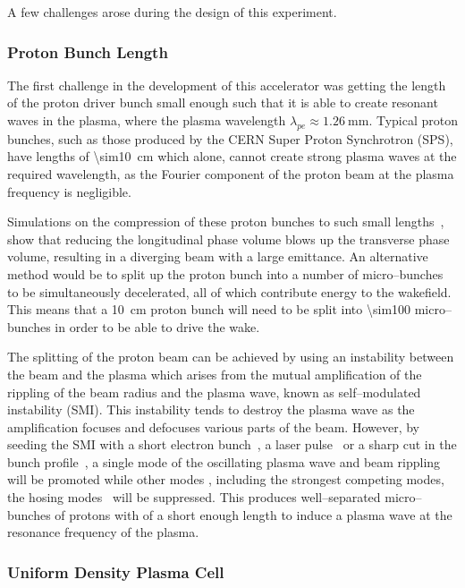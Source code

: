 A few challenges arose during the design of this experiment.

\subsubsection{Proton Bunch Length}

The first challenge in the development of this accelerator was getting the
length of the proton driver bunch small enough such that it is able to create
resonant waves in the plasma, where the plasma wavelength \(\lambda_{pe} \approx
\SI{1.26}{\milli\meter}\).  Typical proton bunches, such as those produced by
the CERN Super Proton Synchrotron (SPS), have lengths of
\SI{\sim10}{\centi\meter} which alone, cannot create strong plasma waves at the
required wavelength, as the Fourier component of the proton beam at the plasma
frequency is negligible. 

Simulations on the compression of these proton bunches to such small
lengths~\cite{kumar2010self}, show that reducing the longitudinal phase volume
blows up the transverse phase volume, resulting in a diverging beam with a large
emittance.  An alternative method would be to split up the proton bunch into a
number of micro--bunches to be simultaneously decelerated, all of which
contribute energy to the wakefield.  This means that a \SI{10}{\centi\meter}
proton bunch will need to be split into \num{\sim100} micro--bunches in order to
be able to drive the wake.


The splitting of the proton beam can be achieved by using an instability
between the beam and the plasma which arises from the mutual
amplification of the rippling of the beam radius and the plasma wave, known as
self--modulated instability (SMI). This
instability tends to destroy the plasma wave as the amplification focuses and
defocuses various parts of the beam. 
However, by seeding the SMI with a short electron bunch~\cite{lotov2013natural},
a laser pulse~\cite{siemon2013laser} or a sharp cut in the bunch
profile~\cite{kumar2010self}, a single mode of the oscillating plasma wave and
beam rippling will be promoted while other modes%
, including the strongest
competing modes, the hosing modes~\cite{vieira2014hosing}
will be suppressed.
This produces
well--separated micro--bunches of protons with of a short enough length to induce
a plasma wave at the resonance frequency of the plasma. 

\subsubsection{Uniform Density Plasma Cell}

